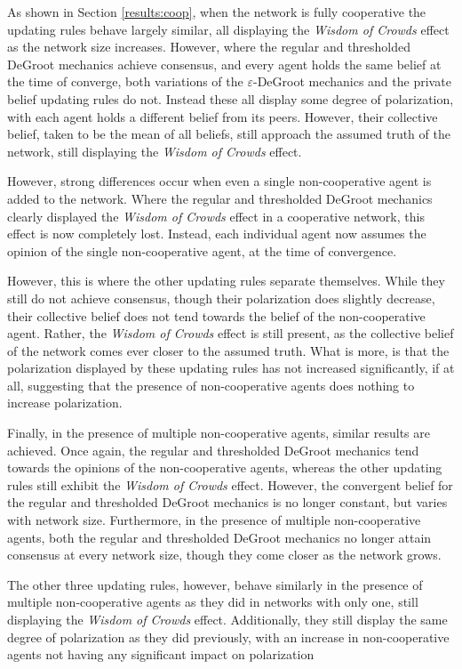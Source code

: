 \documentclass[a4paper, 12pt]{report}
\begin{document}
As shown in Section \ref{results:coop}, when the network is fully cooperative the updating rules behave largely similar, all displaying the \emph{Wisdom of Crowds} effect as the network size increases. However, where the regular and thresholded DeGroot mechanics achieve consensus, and every agent holds the same belief at the time of converge, both variations of the $\varepsilon$-DeGroot mechanics and the private belief updating rules do not. Instead these all display some degree of polarization, with each agent holds a different belief from its peers. However, their collective belief, taken to be the mean of all beliefs, still approach the assumed truth of the network, still displaying the \emph{Wisdom of Crowds} effect.

However, strong differences occur when even a single non-cooperative agent is added to the network. Where the regular and thresholded DeGroot mechanics clearly displayed the \emph{Wisdom of Crowds} effect in a cooperative network, this effect is now completely lost. Instead, each individual agent now assumes the opinion of the single non-cooperative agent, at the time of convergence. 

However, this is where the other updating rules separate themselves. While they still do not achieve consensus, though their polarization does slightly decrease, their collective belief does not tend towards the belief of the non-cooperative agent. Rather, the \emph{Wisdom of Crowds} effect is still present, as the collective belief of the network comes ever closer to the assumed truth. What is more, is that the polarization displayed by these updating rules has not increased significantly, if at all, suggesting that the presence of non-cooperative agents does nothing to increase polarization.

Finally, in the presence of multiple non-cooperative agents, similar results are achieved. Once again, the regular and thresholded DeGroot mechanics tend towards the opinions of the non-cooperative agents, whereas the other updating rules still exhibit the \emph{Wisdom of Crowds} effect. However, the convergent belief for the regular and thresholded DeGroot mechanics is no longer constant, but varies with network size. Furthermore, in the presence of multiple non-cooperative agents, both the regular and thresholded DeGroot mechanics no longer attain consensus at every network size, though they come closer as the network grows. 

The other three updating rules, however, behave similarly in the presence of multiple non-cooperative agents as they did in networks with only one, still displaying the \emph{Wisdom of Crowds} effect. Additionally, they still display the same degree of polarization as they did previously, with an increase in non-cooperative agents not having any significant impact on polarization
\end{document}
